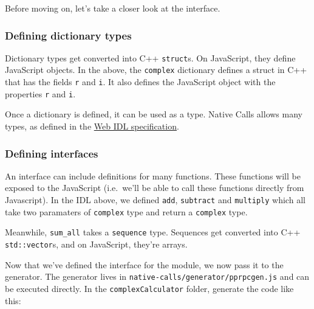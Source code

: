 Before moving on, let's take a closer look at the interface.

\subsubsection{Defining dictionary
types}\label{defining-dictionary-types}

Dictionary types get converted into C++ \texttt{struct}s. On JavaScript,
they define JavaScript objects. In the above, the \texttt{complex}
dictionary defines a struct in C++ that has the fields \texttt{r} and
\texttt{i}. It also defines the JavaScript object with the properties
\texttt{r} and \texttt{i}.

Once a dictionary is defined, it can be used as a type. Native Calls
allows many types, as defined in the
\href{http://www.w3.org/TR/WebIDL/}{Web IDL specification}.

\subsubsection{Defining interfaces}\label{defining-interfaces}

An interface can include definitions for many functions. These functions
will be exposed to the JavaScript (i.e.~we'll be able to call these
functions directly from Javascript). In the IDL above, we defined
\texttt{add}, \texttt{subtract} and \texttt{multiply} which all take two
paramaters of \texttt{complex} type and return a \texttt{complex} type.

Meanwhile, \texttt{sum\_all} takes a \texttt{sequence} type. Sequences
get converted into C++ \texttt{std::vector}s, and on JavaScript, they're
arrays.


Now that we've defined the interface for the module, we now pass it to
the generator. The generator lives in
\texttt{native-calls/generator/pprpcgen.js} and can be executed
directly. In the \texttt{complexCalculator} folder, generate the code
like this:

\begin{Shaded}
\begin{Highlighting}[]
 
\end{Highlighting}
\end{Shaded}

